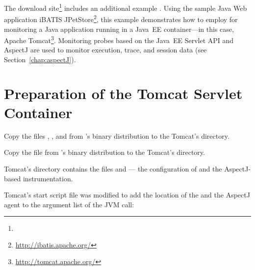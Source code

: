 The \Kieker{} download site\footnote{\KiekerDownloadURL{}} includes an additional %
example \file{\JavaEEServletExampleName}. Using the sample Java Web application %
iBATIS JPetStore\footnote{\url{http://ibatis.apache.org/}}, this example %
demonstrates how to employ \KiekerMonitoringPart{} for monitoring a Java application %
running in a Java~EE container---in this case, Apache Tomcat\footnote{\url{http://tomcat.apache.org/}}. %
Monitoring probes based on the Java~EE Servlet API %
and AspectJ are used to monitor execution, trace, and session data (see Section~\ref{chap:aspectJ}).

\section{Preparation of the Tomcat Servlet Container}

\begin{compactenum}
\item Copy the files \file{\mainJar}, \file{\commonsLoggingJar}, and \file{\aspectJWeaverJar} from %
\Kieker{}'s binary distribution to the Tomcat's  directory.
\item Copy the file \file{\servletWar} from \Kieker{}'s %
binary distribution to the Tomcat's  directory.
\item Tomcat's  directory contains the files  %
and  --- the configuration of \KiekerMonitoringPart{} and the %
AspectJ-based instrumentation. %
\item
 Tomcat's start script  file was modified to add the location %
of the  and the AspectJ agent to the argument %
list of the JVM call:
\end{compactenum}

\enlargethispage{1cm}

\setPropertiesListing


\setPropertiesListing




